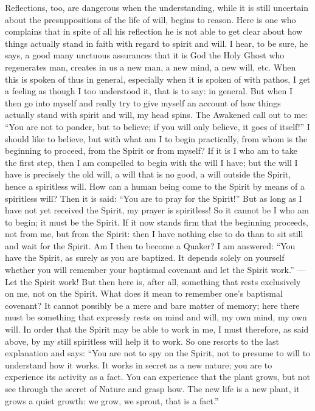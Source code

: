 \documentclass[12pt,a4paper,openany]{book}
\newcommand{\opage}[1]{\marginnote{\footnotesize\textit{[#1]}}}
\begin{document}
\setcounter{footnote}{0}%
\opage{9}Reflections, too, are dangerous when the understanding, while
it is still uncertain about the presuppositions of the life of will,
begins to reason. Here is one who complains that in spite
of all his reflection he is not able to get clear about how things
actually stand in faith with regard to
spirit and will. I hear, to be sure, he says, a
good many unctuous assurances that it is God
the Holy Ghost who regenerates man, creates in us a
new man, a new mind, a new will, etc. When
this is spoken of thus in general, especially when it is
spoken of with pathos, I get a feeling as though I too
understood it, that is to say: in general. But when I
then go into myself and really try to give myself an account of
how things actually stand with spirit and will,
my head spins. The Awakened call out to me:
``You are not to ponder, but to believe; if you will only believe, it
goes of itself!'' I should like to believe, but with what
am I to begin practically, from whom is the beginning to proceed,
from the Spirit or from myself? If it is I who am to
take the first step, then I am compelled to begin
with the will I have; but the will I have is
precisely the old will, a will that is no good, a will
outside the Spirit, hence a spiritless will. How can
a human being come to the Spirit by means of a spiritless
will? Then it is said: ``You are to pray for the Spirit!'' But
as long as I have not yet received the Spirit, my prayer is
spiritless! So it cannot be I who am to begin;
it must be the Spirit. If it now stands firm that the beginning
proceeds, not from me, but from the Spirit: then I have nothing
else to do than to sit still and wait for the Spirit.
Am I then to become a Quaker? I am answered: ``You
have the Spirit, as surely as you are baptized. It depends solely
on yourself whether you will remember your baptismal covenant and
let the Spirit work.'' --- Let the Spirit work! But then
here is, after all, something that rests exclusively on me,
not on the Spirit. What does it mean to remember one's
baptismal covenant? It cannot possibly be a mere and bare
\setcounter{footnote}{0}%
\opage{10}matter of memory; here there must be something that expressly
rests on mind and will, my own mind, my own
will. In order that the Spirit may be able to work in me, I must
therefore, as said above, by my still spiritless
will help it to work. So one
resorts to the last explanation and says: ``You are not to
spy on the Spirit, not to presume to will to understand how
it works. It works in secret as a new nature;
you are to experience its activity as a fact.
You can experience that the plant grows, but not see through
the secret of Nature and grasp how. The new life
is a new plant, it grows a quiet growth: we grow, we
sprout, that is a fact.''
\end{document}
